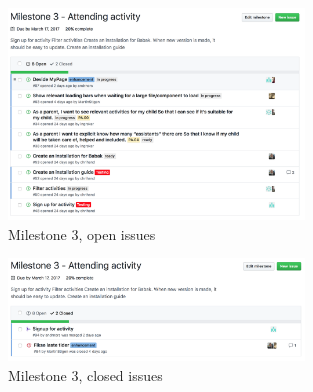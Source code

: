\begin{figure}[h!]
\centering
    \includegraphics[width=0.7\textwidth]{fig/open_issues}
\caption{Milestone 3, open issues}
\label{Open Issues}
\end{figure}

\begin{figure}[h!]
\centering
    \includegraphics[width=0.7\textwidth]{fig/closed_issues}
\caption{Milestone 3, closed issues}
\label{Closed Issues}
\end{figure}


\cleardoublepage